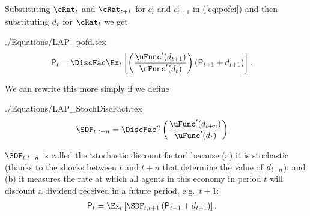 \documentclass{\handout}
\begin{document}
\hypertarget{pofd}{}
Substituting $\cRat_{t}$ and $\cRat_{t+1}$ for $c_{t}^{i}$ and $c_{t+1}^{i}$ in  (\ref{eq:pofci}) and then
substituting $d_{t}$ for $\cRat_{t}$ we get
\begin{verbatimwrite}{./Equations/LAP_pofd.tex}
\begin{equation}\begin{gathered}\begin{aligned}
 \Price_{t} & =  \DiscFac \Ex_{t}\left[\left(\frac{\uFunc^{\prime}(\dvdnd_{t+1})}{\uFunc^{\prime}(\dvdnd_{t})}\right)\left({\Price}_{t+1}+\dvdnd_{t+1}\right)\right] \label{eq:pofd}.
\end{aligned}\end{gathered}\end{equation}
\end{verbatimwrite}



We can rewrite this more simply if we define
\begin{verbatimwrite}{./Equations/LAP_StochDiscFact.tex}
\begin{equation}\begin{gathered}\begin{aligned}
  \label{eq:StochDiscFact}
  \SDF_{t,t+n} & =  \DiscFac^{n} \left(\frac{\uFunc^{\prime}(\dvdnd_{t+n})}{\uFunc^{\prime}(\dvdnd_{t})}\right)
\end{aligned}\end{gathered}\end{equation}
\end{verbatimwrite}


$\SDF_{t,t+n}$ is called the `stochastic discount factor' because (a) it is stochastic (thanks to the shocks between $t$ and $t+n$ that determine the value of $d_{t+n}$); and (b) it measures the rate at which all agents in this economy in period $t$ will discount a dividend received in a future period, e.g.\ $t+1$: \hypertarget{Pt}{}
\begin{equation}\begin{gathered}\begin{aligned}
 \Price_{t} & =  \Ex_{t}\left[\SDF_{t,t+1}\left({\Price}_{t+1}+\dvdnd_{t+1}\right)\right] . \label{eq:Pt}
\end{aligned}\end{gathered}\end{equation}
\end{document}

